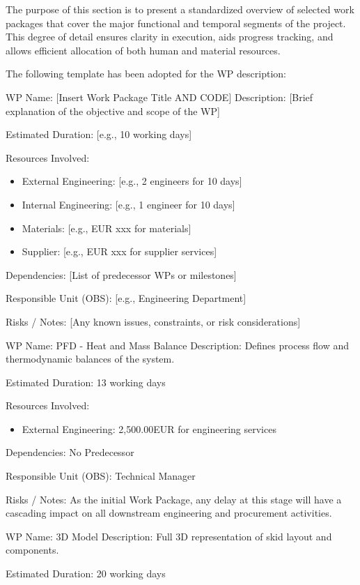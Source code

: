The purpose of this section is to present a standardized overview of selected work packages that cover the major functional and temporal segments of the project. This degree of detail ensures clarity in execution, aids progress tracking, and allows efficient allocation of both human and material resources.

The following template has been adopted for the WP description:

WP Name: [Insert Work Package Title AND CODE]
Description:
[Brief explanation of the objective and scope of the WP]

Estimated Duration: [e.g., 10 working days]

Resources Involved:
\begin{itemize}
    \item External Engineering: [e.g., 2 engineers for 10 days]
    \item Internal Engineering: [e.g., 1 engineer for 10 days]
    \item Materials: [e.g., EUR xxx for materials]
    \item Supplier: [e.g., EUR xxx for supplier services]
\end{itemize}

Dependencies:
[List of predecessor WPs or milestones]

Responsible Unit (OBS): [e.g., Engineering Department]

Risks / Notes:
[Any known issues, constraints, or risk considerations]

WP Name: PFD - Heat and Mass Balance
Description:
Defines process flow and thermodynamic balances of the system.

Estimated Duration: 13 working days

Resources Involved:
\begin{itemize}
    \item External Engineering: 2,500.00EUR  for engineering services
\end{itemize}

Dependencies:
No Predecessor

Responsible Unit (OBS): Technical Manager

Risks / Notes:
As the initial Work Package, any delay at this stage will have a cascading impact on all downstream engineering and procurement activities.

WP Name: 3D Model
Description:
Full 3D representation of skid layout and components.

Estimated Duration: 20 working days

